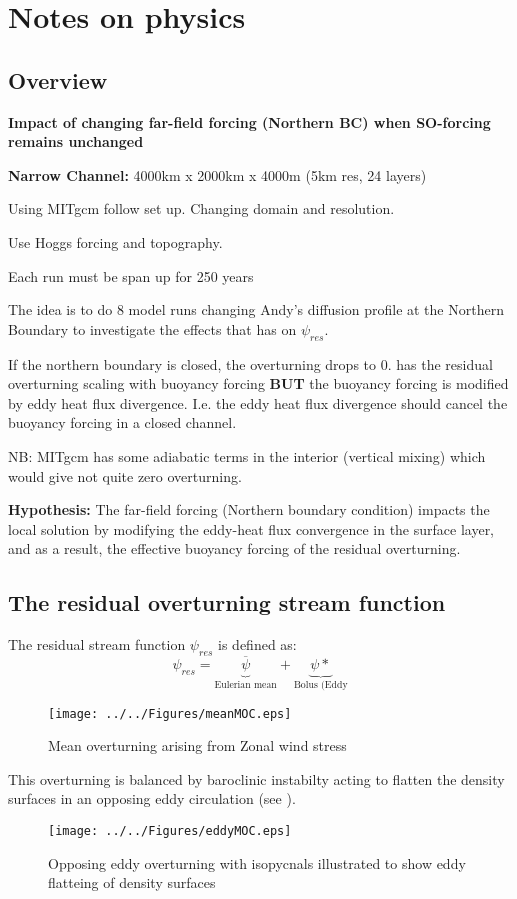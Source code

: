  
\section{Notes on physics}
\subsection{Overview}


\textbf{Impact of changing far-field forcing (Northern BC) when SO-forcing remains unchanged}
\begin{description}
\item \textbf{Narrow Channel:} 4000km x 2000km x 4000m (5km res, 24 layers) 
\item Using MITgcm follow \citet{hogg2010} set up. Changing domain and resolution.
\item Use Hoggs forcing and topography.
\item Each run must be span up for 250 years
\end{description}
The idea is to do 8 model runs changing Andy's diffusion profile at the Northern Boundary to investigate the effects that has on $\psi_{res}$.

If the northern boundary is closed, the overturning drops to 0. \citet{MR03} has the residual overturning scaling with buoyancy forcing \textbf{BUT} the buoyancy forcing is modified by eddy heat flux divergence. I.e. the eddy heat flux divergence should cancel the buoyancy forcing in a closed channel.

NB: MITgcm has some adiabatic terms in the interior (vertical mixing) which would give not quite zero overturning.

\textbf{Hypothesis:} The far-field forcing (Northern boundary condition) impacts the local solution by modifying the eddy-heat flux convergence in the surface layer, and as a result, the effective buoyancy forcing of the residual overturning.

\subsection{The residual overturning stream function}
The residual stream function $\psi_{res}$ is defined as:
\begin{equation}
\psi_{res}=\underbrace{\overline{\psi}}_\text{Eulerian mean} + \underbrace{\psi*}_\text{Bolus (Eddy}
\label{EQ:psires}
\end{equation}
\begin{figure}
\centering
\texttt{[image: ../../Figures/meanMOC.eps]}
\caption{Mean overturning arising from Zonal wind stress}
\label{fig:mean}
\end{figure}
This overturning is balanced by baroclinic instabilty acting to flatten the density surfaces in an opposing eddy circulation (see ).
\begin{figure}
\centering
\texttt{[image: ../../Figures/eddyMOC.eps]}
\caption{Opposing eddy overturning with isopycnals illustrated to show eddy flatteing of density surfaces}
\label{fig:eddy}
\end{figure}
